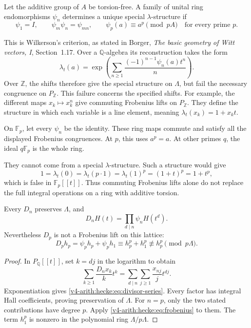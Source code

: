 \begin{theorem}
\label{v4-arith:hecke:thm:wilkerson}
Let the additive group of $A$ be torsion-free.
A family of unital ring endomorphisms $\psi_n$ determines a unique
special $\lambda$-structure if
\[
 \psi_1=I,\qquad \psi_m\psi_n=\psi_{mn},\qquad
 \psi_p(a)\equiv a^p\pmod{pA}\quad\text{for every prime }p.
\]
\end{theorem}

This is Wilkerson's criterion, as stated in Borger,
\emph{The basic geometry of Witt vectors, I}, Section~1.17.
Over a $\mathbb Q$-algebra its reconstruction takes the form
\[
 \lambda_t(a)=\exp\left(
 \sum_{n\geq1}\frac{(-1)^{n-1}\psi_n(a)t^n}{n}\right).
\]
Over $\mathbb Z$, the shifts therefore give the special structure
on $\Lambda$, but fail the necessary congruence on $P_{\mathbb Z}$.
This failure concerns the specified shifts.
For example, the different maps $x_k\mapsto x_k^n$ give
commuting Frobenius lifts on $P_{\mathbb Z}$.
They define the structure in which each variable is a line element,
meaning $\lambda_t(x_k)=1+x_kt$.

\begin{example}
\label{v4-arith:hecke:ex:torsion-lambda}
On $\mathbb F_p$, let every $\psi_n$ be the identity.
These ring maps commute and satisfy all the displayed Frobenius congruences.
At $p$, this uses $a^p=a$. At other primes $q$, the ideal
$q\mathbb F_p$ is the whole ring.

They cannot come from a special $\lambda$-structure.
Such a structure would give
\[
 1=\lambda_t(0)=\lambda_t(p\cdot1)
   =\lambda_t(1)^p=(1+t)^p=1+t^p,
\]
which is false in $\mathbb F_p[[t]]$.
Thus commuting Frobenius lifts alone do not replace the full
integral operations on a ring with additive torsion.
\end{example}

\begin{proposition}
\label{v4-arith:hecke:prop:hall-lattice}
Every $D_n$ preserves $\Lambda$, and
\begin{equation}
 \label{v4-arith:hecke:eq:divisor-series}
 D_nH(t)=\prod_{d\mid n}\psi_nH(t^d).
\end{equation}
Nevertheless $D_p$ is not a Frobenius lift on this lattice:
\[
 D_ph_p=\psi_ph_p+\psi_ph_1
 \equiv h_p^p+h_1^p\not\equiv h_p^p\pmod{p\Lambda}.
\]
\end{proposition}
\begin{proof}
In $P_{\mathbb Q}[[t]]$, set $k=dj$ in the logarithm to obtain
\[
 \sum_{k\geq1}\frac{D_nx_k}{k}t^k
 =\sum_{d\mid n}\sum_{j\geq1}\frac{x_{nj}}j t^{dj}.
\]
Exponentiation gives \eqref{v4-arith:hecke:eq:divisor-series}.
Every factor has integral Hall coefficients, proving preservation of $\Lambda$.
For $n=p$, only the two stated contributions have degree $p$.
Apply \eqref{v4-arith:hecke:eq:frobenius} to them.
The term $h_1^p$ is nonzero in the polynomial ring $\Lambda/p\Lambda$.
\end{proof}

